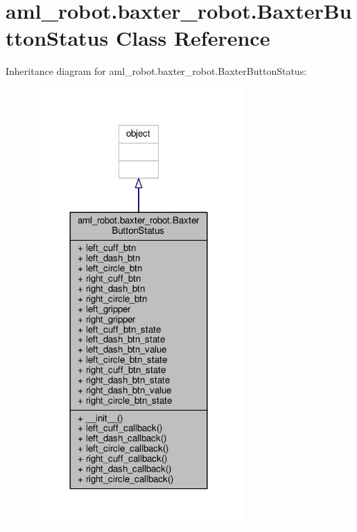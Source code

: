 \hypertarget{classaml__robot_1_1baxter__robot_1_1_baxter_button_status}{\section{aml\-\_\-robot.\-baxter\-\_\-robot.\-Baxter\-Button\-Status Class Reference}
\label{classaml__robot_1_1baxter__robot_1_1_baxter_button_status}
}


Inheritance diagram for aml\-\_\-robot.\-baxter\-\_\-robot.\-Baxter\-Button\-Status\-:
\nopagebreak
\begin{figure}[H]
\begin{center}
\leavevmode
\includegraphics[width=228pt]{classaml__robot_1_1baxter__robot_1_1_baxter_button_status__inherit__graph}
\end{center}
\end{figure}


